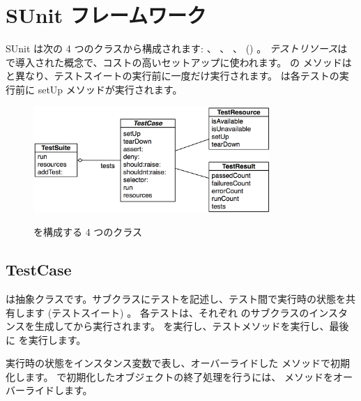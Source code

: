 \documentclass[a4paper,10pt,twoside]{book}
\begin{document}

\section{SUnit フレームワーク}

SUnit は次の 4 つのクラスから構成されます:  、
 、  、  () 。
\emph{テストリソース}は  で導入された概念で、コストの高いセットアップに使われます。
 の  メソッドは  と異なり、テストスイートの実行前に一度だけ実行されます。  は各テストの実行前に setUp メソッドが実行されます。

\begin{figure}[htb]
  \begin{center}
		{\includegraphics[width=0.8\textwidth]{sunit-classes}}
	\caption{\SUnit を構成する 4 つのクラス}
  \end{center}
\end{figure}

\subsection{TestCase}

 は抽象クラスです。サブクラスにテストを記述し、テスト間で実行時の状態を共有します (テストスイート) 。
各テストは、それぞれ  のサブクラスのインスタンスを生成してから実行されます。  を実行し、テストメソッドを実行し、最後に  を実行します。

実行時の状態をインスタンス変数で表し、オーバーライドした  メソッドで初期化します。  で初期化したオブジェクトの終了処理を行うには、  メソッドをオーバーライドします。
\end{document}
